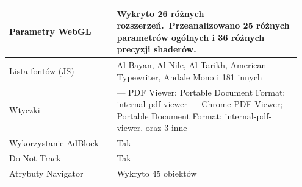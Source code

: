 \begin{table}[p]
\begin{tabular}{|p{0.35\linewidth} | p{0.6\linewidth}|}
        Parametry WebGL              & Wykryto 26 różnych rozszerzeń.\ Przeanalizowano 25 różnych parametrów ogólnych i 36 różnych precyzji shaderów.                                                                                                                                                                                                                                                                                                                                \\ \hline
        Lista fontów (JS)            & Al Bayan, Al Nile, Al Tarikh, American Typewriter, Andale Mono i 181 innych                                                                                                                                                                                                                                                                                                                                                                   \\ \hline
        Wtyczki &
        --- PDF Viewer; Portable Document Format; internal-pdf-viewer\newline
        --- Chrome PDF Viewer; Portable Document Format; internal-pdf-viewer.\newline
        oraz 3 inne \\ \hline
        Wykorzystanie AdBlock        & Tak                                                                                                                                                                                                                                                                                                                                                                                                                                           \\ \hline
        Do Not Track                 & Tak                                                                                                                                                                                                                                                                                                                                                                                                                                           \\ \hline
        Atrybuty Navigator           & Wykryto 45 obiektów                                                                                                                                                                                                                                                                                                                                                                                                                           \\ \hline

\end{tabular}
\end{table}
